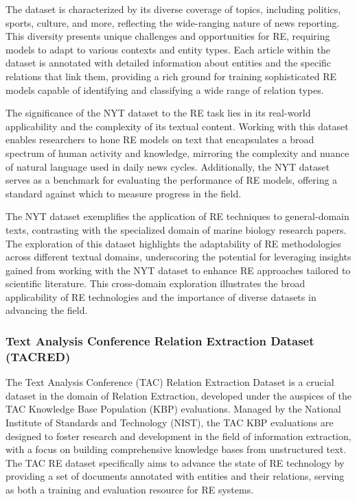 The dataset is characterized by its diverse coverage of topics, including politics, sports, culture, and more, reflecting the wide-ranging nature of news reporting. This diversity presents unique challenges and opportunities for RE, requiring models to adapt to various contexts and entity types. Each article within the dataset is annotated with detailed information about entities and the specific relations that link them, providing a rich ground for training sophisticated RE models capable of identifying and classifying a wide range of relation types.

The significance of the NYT dataset to the RE task lies in its real-world applicability and the complexity of its textual content. Working with this dataset enables researchers to hone RE models on text that encapsulates a broad spectrum of human activity and knowledge, mirroring the complexity and nuance of natural language used in daily news cycles. Additionally, the NYT dataset serves as a benchmark for evaluating the performance of RE models, offering a standard against which to measure progress in the field.

The NYT dataset exemplifies the application of RE techniques to general-domain texts, contrasting with the specialized domain of marine biology research papers. The exploration of this dataset highlights the adaptability of RE methodologies across different textual domains, underscoring the potential for leveraging insights gained from working with the NYT dataset to enhance RE approaches tailored to scientific literature. This cross-domain exploration illustrates the broad applicability of RE technologies and the importance of diverse datasets in advancing the field.

\subsubsection{Text Analysis Conference Relation Extraction Dataset (TACRED)}
The Text Analysis Conference (TAC) Relation Extraction Dataset is a crucial dataset in the domain of Relation Extraction, developed under the auspices of the TAC Knowledge Base Population (KBP) evaluations. Managed by the National Institute of Standards and Technology (NIST), the TAC KBP evaluations are designed to foster research and development in the field of information extraction, with a focus on building comprehensive knowledge bases from unstructured text\cite{TAC}. The TAC RE dataset specifically aims to advance the state of RE technology by providing a set of documents annotated with entities and their relations, serving as both a training and evaluation resource for RE systems.

